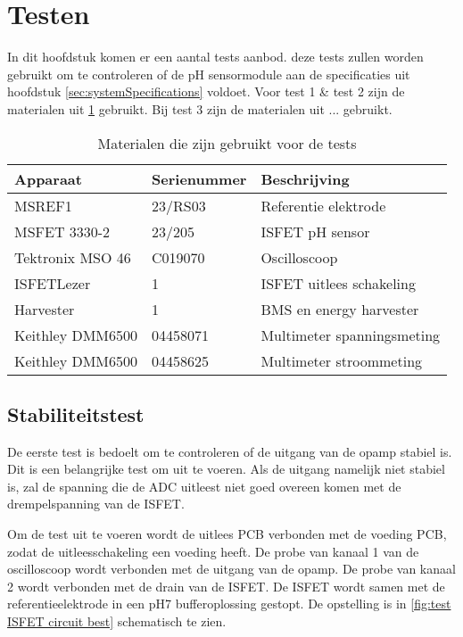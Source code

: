 \section{Testen}
In dit hoofdstuk komen er een aantal tests aanbod. deze tests zullen worden gebruikt om te controleren of de pH sensormodule aan de specificaties uit hoofdstuk \ref{sec:systemSpecifications} voldoet. Voor test 1 \& test 2 zijn de materialen uit \cref{tab:testMaterialen} gebruikt. Bij test 3 zijn de materialen uit ... gebruikt.
\begin{table}[ht]
    \centering
    \begin{tabular}{l|l|l}
        Apparaat         & Serienummer & Beschrijving \\
        \hline
        MSREF1           & 23/RS03     & Referentie elektrode       \\
        MSFET 3330-2     & 23/205      & ISFET pH sensor            \\
        Tektronix MSO 46 & C019070     & Oscilloscoop               \\
        ISFETLezer       & 1           & ISFET uitlees schakeling   \\
        Harvester        & 1           & BMS en energy harvester    \\
        Keithley DMM6500 & 04458071    & Multimeter spanningsmeting \\
        Keithley DMM6500 & 04458625    & Multimeter stroommeting    \\

        \hline
    \end{tabular}
    \caption{Materialen die zijn gebruikt voor de tests}
    \label{tab:testMaterialen}
\end{table}

\subsection{Stabiliteitstest}
De eerste test is bedoelt om te controleren of de uitgang van de opamp stabiel is. Dit is een belangrijke test om uit te voeren. Als de uitgang namelijk niet stabiel is, zal de spanning die de ADC uitleest niet goed overeen komen met de drempelspanning van de ISFET.

Om de test uit te voeren wordt de uitlees PCB verbonden met de voeding PCB, zodat de uitleesschakeling een voeding heeft. De probe van kanaal 1 van de oscilloscoop wordt verbonden met de uitgang van de opamp. De probe van kanaal 2 wordt verbonden met de drain van de ISFET. De ISFET wordt samen met de referentieelektrode in een pH7 bufferoplossing gestopt. De opstelling is in \cref{fig:test ISFET circuit best} schematisch te zien.

